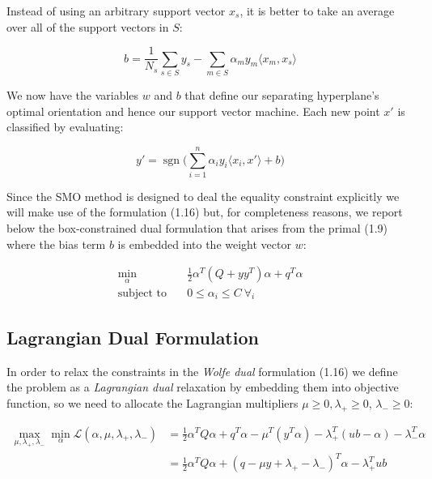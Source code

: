 Instead of using an arbitrary support vector $x_s$, it is better to take an average over all of the support vectors in $S$:

\begin{equation}
	b=\frac{1}{N_s}\sum_{s\in S} y_s-\sum_{m\in S}\alpha_m y_m \langle x_m, x_s \rangle \tag{1.21}
\end{equation}

We now have the variables $w$ and $b$ that define our separating hyperplane's optimal orientation and hence our support vector machine. Each new point $x'$ is classified by evaluating:

\begin{equation}
    y'=\operatorname{sgn}\big(\sum_{i=1}^{n}\alpha_i y_i\langle x_i, x' \rangle+b\big) \tag{1.22}
\end{equation}

Since the SMO method is designed to deal the equality constraint explicitly we will make use of the formulation (1.16) but, for completeness reasons, we report below the box-constrained dual formulation \cite{hsu2002simple} that arises from the primal (1.9) where the bias term $b$ is embedded into the weight vector $w$:

\begin{equation}
    \begin{aligned}
        \min_{\alpha} \quad & \frac{1}{2} \alpha^T (Q + yy^T)\alpha+q^T\alpha \\
            \textrm{subject to} \quad & 0\leq\alpha_i\leq C \ \forall_i
    \end{aligned} \tag{1.23}
\end{equation}

\subsection{Lagrangian Dual Formulation}

In order to relax the constraints in the \emph{Wolfe dual} formulation (1.16) we define the problem as a \emph{Lagrangian dual} relaxation by embedding them into objective function, so we need to allocate the Lagrangian multipliers $\mu \geq 0, \lambda_+ \geq 0$, $\lambda_- \geq 0$:

\begin{align*}
    \max_{\mu,\lambda_+,\lambda_-} \min_{\alpha} \mathcal{L}(\alpha,\mu,\lambda_+,\lambda_-) &= \frac{1}{2} \alpha^T Q\alpha+q^T\alpha - \mu^T (y^T \alpha) - \lambda_+^T (ub - \alpha) - \lambda_-^T \alpha \\
    &= \frac{1}{2} \alpha^T Q\alpha + (q - \mu y + \lambda_+ - \lambda_-)^T \alpha - \lambda_+^T ub \tag{1.24}
\end{align*}

